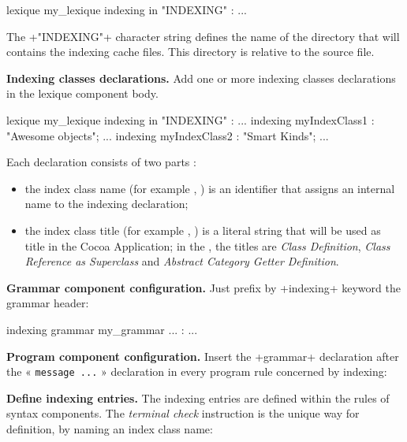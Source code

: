 \begin{galgas}
lexique my_lexique indexing in "INDEXING" :
  ...
\end{galgas}

The \ggs+"INDEXING"+ character string defines the name of the directory that will contains the indexing cache files. This directory is relative to the source file.

 \textbf{Indexing classes declarations.} Add one or more indexing classes declarations in the lexique component body.


\begin{galgas}
lexique my_lexique indexing in "INDEXING" :
  ...
indexing myIndexClass1 : "Awesome objects";
  ...
indexing myIndexClass2 : "Smart Kinds";
  ...
\end{galgas}

Each declaration consists of two parts :
\begin{itemize}
\item the index class name (for example , ) is an identifier that assigns an internal name to the indexing declaration;
\item the index class title (for example , ) is a literal string that will be used as title in the Cocoa Application; in the , the titles are \emph{Class Definition}, \emph{Class Reference as Superclass} and \emph{Abstract Category Getter Definition}.
\end{itemize}

\noindent{} \textbf{Grammar component configuration.} Just prefix by \ggs+indexing+ keyword the grammar header:

\begin{galgas}
indexing grammar my_grammar ... :
  ...
\end{galgas}



\noindent{} \textbf{Program component configuration.} Insert the \ggs+grammar+ declaration after the « \texttt{message ...} » declaration in every program rule concerned by indexing:

\begin{galgas}
case ...
message ...
grammar my_grammar
?@lstring inSourceFile {
  ...
\end{galgas}






\noindent{} \textbf{Define indexing entries.} The indexing entries are defined within the rules of syntax components. The \emph{terminal check} instruction is the unique way for definition, by naming an index class name:

